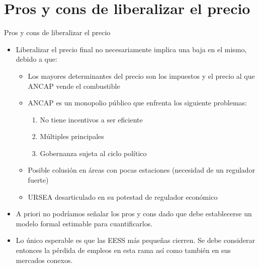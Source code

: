 \documentclass[10pt]{beamer}
\begin{document}

\section{Pros y cons de liberalizar el precio}

\begin{frame}{Pros y cons de liberalizar el precio}

\begin{itemize}
\item Liberalizar el precio final no necesariamente implica una baja en el mismo, debido a que:
	\begin{itemize}
	\item Los mayores determinantes del precio son los impuestos y el precio al que ANCAP vende el combustible
	\item ANCAP es un monopolio público que enfrenta los siguiente problemas:
		\begin{enumerate}
		\item No tiene incentivos a ser eficiente
		\item Múltiples principales
		\item Gobernanza sujeta al ciclo político
		\end{enumerate} 
	\item Posible colusión en áreas con pocas estaciones (necesidad de un regulador fuerte)
	\item URSEA desarticulado en su potestad de regulador económico
	\end{itemize}
\item A priori no podríamos señalar los pros y cons dado que debe establecerse un modelo formal estimable para cuantificarlos.
\item Lo único esperable es que las EESS más pequeñas cierren. Se debe considerar entonces la pérdida de empleos en esta rama así como también en sus mercados conexos.
\end{itemize}

\end{frame}

\end{document}
